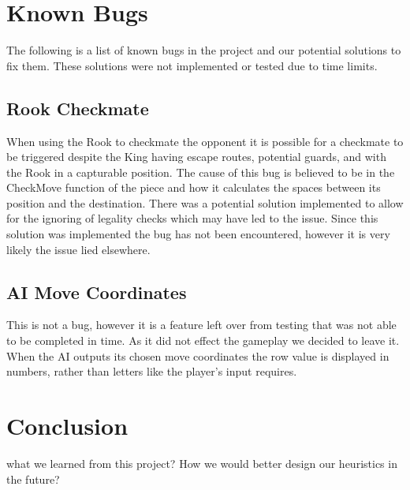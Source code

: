 \documentclass[conference]{IEEEtran}
\begin{document}
\section{Known Bugs}
The following is a list of known bugs in the project and our potential solutions to fix them. These solutions were not implemented or tested due to time limits. 

\subsection{Rook Checkmate}
When using the Rook to checkmate the opponent it is possible for a checkmate to be triggered despite the King having escape routes, potential guards, and with the Rook in a capturable position. The cause of this bug is believed to be in the CheckMove function of the piece and how it calculates the spaces between its position and the destination. There was a potential solution implemented to allow for the ignoring of legality checks which may have led to the issue. Since this solution was implemented the bug has not been encountered, however it is very likely the issue lied elsewhere. 

\subsection{AI Move Coordinates}
This is not a bug, however it is a feature left over from testing that was not able to be completed in time. As it did not effect the gameplay we decided to leave it. When the AI outputs its chosen move coordinates the row value is displayed in numbers, rather than letters like the player's input requires. 

\section{Conclusion}
what we learned from this project? How we would better design our heuristics in the future?\\
\end{document}
